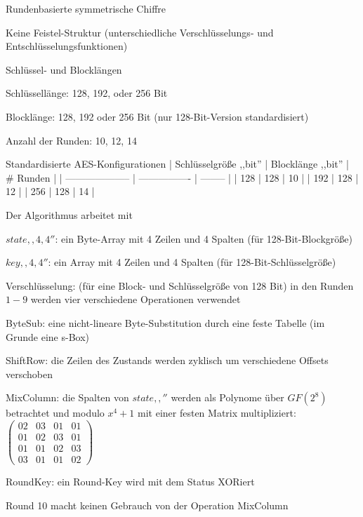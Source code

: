 \documentclass[a4paper]{article}
\begin{document}
\begin{multicols}{3}
\begin{itemize*}
\begin{itemize*}
            \end{itemize*}
            \item Rundenbasierte symmetrische Chiffre
            \item Keine Feistel-Struktur (unterschiedliche Verschlüsselungs- und
            Entschlüsselungsfunktionen)
            \item Schlüssel- und Blocklängen
            \begin{itemize*}
                  \item Schlüssellänge: 128, 192, oder 256 Bit
                  \item Blocklänge: 128, 192 oder 256 Bit (nur 128-Bit-Version standardisiert)
                  \item Anzahl der Runden: 10, 12, 14
            \end{itemize*}
      \end{itemize*}

      Standardisierte AES-Konfigurationen | Schlüsselgröße ,,bit''
      | Blocklänge ,,bit'' | \# Runden |
      | --------------------
      | ---------------- |
      -------- | | 128 | 128
      | 10 | | 192 | 128 | 12
      | | 256 | 128 | 14 |

      \begin{itemize*}
            \item Der Algorithmus arbeitet mit
            \begin{itemize*}
                  \item $state,,4, 4''$: ein Byte-Array mit 4 Zeilen und 4 Spalten (für 128-Bit-Blockgröße)
                  \item $key,,4, 4''$: ein Array mit 4 Zeilen und 4 Spalten (für 128-Bit-Schlüsselgröße)
            \end{itemize*}
            \item Verschlüsselung: (für eine Block- und Schlüsselgröße von 128 Bit) in
            den Runden $1-9$ werden vier verschiedene Operationen verwendet
            \begin{itemize*}
                  \item ByteSub: eine nicht-lineare Byte-Substitution durch eine feste Tabelle (im Grunde eine s-Box)
                  \item ShiftRow: die Zeilen des Zustands werden zyklisch um verschiedene Offsets verschoben
                  \item MixColumn: die Spalten von $state,,''$ werden als Polynome über $GF(2^8)$ betrachtet und modulo $x^4+1$ mit einer festen Matrix multipliziert: $\begin{pmatrix} 02&03&01&01\\ 01&02&03&01 \\ 01&01&02&03\\ 03&01&01&02 \end{pmatrix}$
                  \item RoundKey: ein Round-Key wird mit dem Status XORiert
            \end{itemize*}
            \item Round 10 macht keinen Gebrauch von der Operation MixColumn
      \end{itemize*}


\end{multicols}
\end{document}

